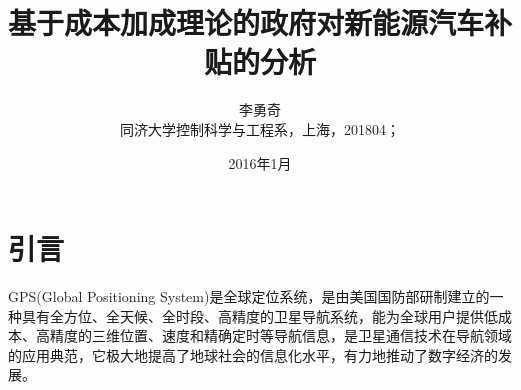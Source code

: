 \documentclass[a4paper, 12pt]{article}
\begin{document}
\newtheorem{example}{例}             %
\newtheorem{theorem}{定理}[section]  %
\newtheorem{definition}{定义}
\newtheorem{axiom}{公理}
\newtheorem{property}{性质}
\newtheorem{proposition}{命题}
\newtheorem{lemma}{引理}
\newtheorem{corollary}{推论}
\newtheorem{remark}{注解}
\newtheorem{condition}{条件}
\newtheorem{conclusion}{结论}
\newtheorem{assumption}{假设}

\renewcommand{\contentsname}{目录}  %
\renewcommand{\refname}{参考文献}   %
\renewcommand{\indexname}{索引}
\renewcommand{\figurename}{图}
\renewcommand{\tablename}{表}
\renewcommand{\appendixname}{附录}
\renewcommand{\algorithmcfname}{算法} %

\title{基于成本加成理论的政府对新能源汽车补贴的分析}
\author{李勇奇\\
 同济大学控制科学与工程系，上海，201804；\\[2ex]}
\date{2016年1月}



\tableofcontents
\newpage
\section{引言}
GPS(Global Positioning System)是全球定位系统，是由美国国防部研制建立的一种具有全方位、全天候、全时段、高精度的卫星导航系统，能为全球用户提供低成本、高精度的三维位置、速度和精确定时等导航信息，是卫星通信技术在导航领域的应用典范，它极大地提高了地球社会的信息化水平，有力地推动了数字经济的发展。
\end{document}
